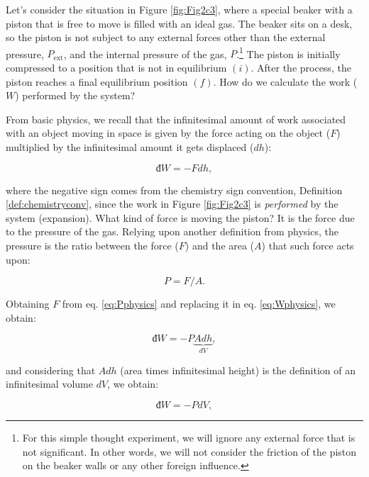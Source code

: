 \documentclass[
  9pt,
]{extbook}
\theoremstyle{definition}
\theoremstyle{definition}
\theoremstyle{definition}
\theoremstyle{remark}
\begin{document}
Let's consider the situation in Figure \ref{fig:Fig2c3}, where a special beaker with a piston that is free to move is filled with an ideal gas. The beaker sits on a desk, so the piston is not subject to any external forces other than the external pressure, \(P_{\text{ext}}\), and the internal pressure of the gas, \(P\).\footnote{For this simple thought experiment, we will ignore any external force that is not significant. In other words, we will not consider the friction of the piston on the beaker walls or any other foreign influence.} The piston is initially compressed to a position that is not in equilibrium \((i)\). After the process, the piston reaches a final equilibrium position \((f)\). How do we calculate the work (\(W\)) performed by the system?

From basic physics, we recall that the infinitesimal amount of work associated with an object moving in space is given by the force acting on the object (\(F\)) multiplied by the infinitesimal amount it gets displaced (\(d h\)):

\begin{equation}
  đ W = - Fdh,
  \label{eq:Wphysics}
\end{equation}

where the negative sign comes from the chemistry sign convention, Definition \ref{def:chemistryconv}, since the work in Figure \ref{fig:Fig2c3} is \emph{performed} by the system (expansion). What kind of force is moving the piston? It is the force due to the pressure of the gas. Relying upon another definition from physics, the pressure is the ratio between the force (\(F\)) and the area (\(A\)) that such force acts upon:

\begin{equation}
  P = F/A.
  \label{eq:Pphysics}
\end{equation}

Obtaining \(F\) from eq. \eqref{eq:Pphysics} and replacing it in eq. \eqref{eq:Wphysics}, we obtain:

\begin{equation}
  đ W = - P \underbrace{Adh}_{dV},
  \label{eq:Wphysics2}
\end{equation}

and considering that \(Adh\) (area times infinitesimal height) is the definition of an infinitesimal volume \(dV\), we obtain:

\begin{equation}
  đ W = - PdV,
  \label{eq:Wdef}
\end{equation}
\end{document}
